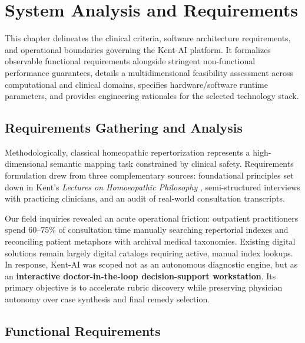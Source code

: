 
\chapter{System Analysis and Requirements}
\label{Chapter3}

This chapter delineates the clinical criteria, software architecture requirements, and operational boundaries governing the Kent-AI platform. It formalizes observable functional requirements alongside stringent non-functional performance guarantees, details a multidimensional feasibility assessment across computational and clinical domains, specifies hardware/software runtime parameters, and provides engineering rationales for the selected technology stack.


\section{Requirements Gathering and Analysis}

Methodologically, classical homeopathic repertorization represents a high-dimensional semantic mapping task constrained by clinical safety. Requirements formulation drew from three complementary sources: foundational principles set down in Kent's \textit{Lectures on Homoeopathic Philosophy} \cite{kent1897}, semi-structured interviews with practicing clinicians, and an audit of real-world consultation transcripts.

Our field inquiries revealed an acute operational friction: outpatient practitioners spend 60--75\% of consultation time manually searching repertorial indexes and reconciling patient metaphors with archival medical taxonomies. Existing digital solutions remain largely digital catalogs requiring active, manual index lookups. In response, Kent-AI was scoped not as an autonomous diagnostic engine, but as an \textbf{interactive doctor-in-the-loop decision-support workstation}. Its primary objective is to accelerate rubric discovery while preserving physician autonomy over case synthesis and final remedy selection.


\section{Functional Requirements}

